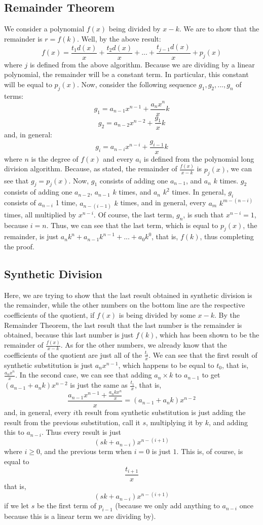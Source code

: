 \documentclass{article}
\theoremstyle{definition}
\begin{document}
\subsection*{Remainder Theorem}


We consider a polynomial $f(x)$ being divided by $x-k$. We are to show that the remainder is $r=f(k)$. Well, by the above result:
\[ f(x)=\frac{t_1d(x)}{x}+\frac{t_2d(x)}{x}+...+\frac{t_{j-1}d(x)}{x}+p_j(x) \] where $j$ is defined from the above algorithm. Because we are dividing by a 
linear polynomial, the remainder will be a constant term. In particular, this constant will be equal to $p_j(x)$. Now, consider the following sequence 
$g_1,g_2,...,g_n$ of terms:
\[ g_1=a_{n-1}x^{n-1}+\frac{a_nx^n}{x}k \]
\[ g_2=a_{n-2}x^{n-2}+\frac{g_1}{x}k \]
and, in general:
\[ g_i=a_{n-i}x^{n-i}+\frac{g_{i-1}}{x}k \]
where $n$ is the degree of $f(x)$ and every $a_i$ is defined from the polynomial long division algorithm. 
Because, as stated, the remainder of 
$\frac{f(x)}{x-k}$ is $p_j(x)$, we can see that $g_j=p_j(x)$. Now, $g_1$ consists of adding one $a_{n-1}$, and $a_n$ $k$ times. $g_2$ consists of adding 
one $a_{n-2}$, $a_{n-1}$ $k$ times, and $a_n$ $k^2$ times. In general, $g_i$ consists of $a_{n-i}$ 1 time, $a_{n-(i-1)}$ $k$ times, and in general, 
every $a_m$ $k^{m-(n-i)}$ times, all multiplied by $x^{n-i}$. Of course, the last term, $g_n$, is such that $x^{n-i}=1$, because $i=n$. Thus, we can see that 
the last term, which is equal to $p_j(x)$, the remainder, is just $a_nk^n+a_{n-1}k^{n-1}+...+a_0k^0$, that is, $f(k)$, thus completing the proof. 

\subsection*{Synthetic Division}


Here, we are trying to show that the last result obtained in synthetic division is the remainder, while the other numbers on the bottom line 
are the respective coefficients of the quotient, if $f(x)$ is being divided by some $x-k$. By the Remainder Theorem, the last result that 
the last number is the remainder is obtained, because this last number is just $f(k)$, which has been shown to be the remainder of $\frac{f(x)}{x-k}$. 
As for the other numbers, we already know that the coefficients of the quotient are just all of the $\frac{t_i}{x}$. 
We can see that the first result of synthetic 
substitution is just $a_nx^{n-1}$, which happens to be equal to $t_0$, that is, $\frac{a_nx^n}{x}$. In the second case, we can see that adding 
$a_n\times k$ to $a_{n-1}$ to get $(a_{n-1}+a_nk)x^{n-2}$ is just the same as $\frac{t_1}{x}$, that is, 
\[ \frac{a_{n-1}x^{n-1}+\frac{a_nkx^n}{x}}{x}=(a_{n-1}+a_nk)x^{n-2} \] and, in general, every $i$th result from synthetic substitution is just 
adding the result from the previous substitution, call it $s$, multiplying it by $k$, and adding this to $a_{n-i}$. Thus every result is just 
\[ (sk+a_{n-i})x^{n-(i+1)} \]
where $i\ge 0$, and the previous term when $i=0$ is just $1$. This is, of course, is equal to
\[ \frac{t_{i+1}}{x} \] that is, \[ (sk+a_{n-i})x^{n-(i+1)} \] 
if we let $s$ be the first term of $p_{i-1}$ (because we only add anything to $a_{n-i}$ once because 
this is a linear term we are dividing by).  
\end{document}
